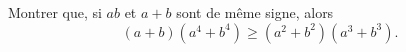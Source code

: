 Montrer que, si $ab$ et $a + b$ sont de même signe, alors
\[ (a + b)(a^4 + b^4) \geq (a^2 + b^2)(a^3 + b^3). \]
